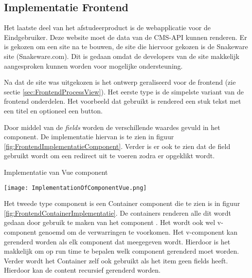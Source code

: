 \subsection{Implementatie Frontend}
Het laatste deel van het afstudeerproduct is de webapplicatie voor de \gls{Eindgebruiker}.
Deze website moet de data van de CMS-API kunnen renderen.
Er is gekozen om een site na te bouwen, de site die hiervoor gekozen is de Snakeware site (Snakeware.com).
Dit is gedaan omdat de developers van de site makkelijk aangesproken kunnen worden voor mogelijke ondersteuning.

\whitespace
Na dat de site was uitgekozen is het ontwerp geraliseerd voor de frontend (zie sectie \ref{sec:FrontendProcessView}).
Het eerste type is de simpelste variant van de frontend onderdelen. 
Het voorbeeld dat gebruikt is rendered een stuk tekst met een titel en optioneel een button.

\whitespace
Door middel van de \textit{fields} worden de verschillende waardes gevuld in het component.
%
De implementatie hiervan is te zien in figuur \ref{fig:FrontendImplementatieComponent}.
Verder is er ook te zien dat de  field gebruikt wordt om  een redirect uit te voeren zodra er opgeklikt wordt.

\whitespace
\begin{graphic}
    \captionsetup{type=figure}
    \caption{Implementatie van Vue component}
    \texttt{[image: ImplementationOfComponentVue.png]}
    \label{fig:FrontendImplementatieComponent}
\end{graphic}

\whitespace
Het tweede type component is een Container component die te zien is in figuur \ref{fig:FrontendContainerImplementatie}.
De containers renderen alle  dit wordt gedaan door gebruik te maken van het component .
Het  wordt ook wel v-component genoemd om de verwarringen te voorkomen.
Het v-component kan gerenderd worden als elk component dat meegegeven wordt.
Hierdoor is het makkelijk om op run time te bepalen welk component gerenderd moet worden.
Verder wordt het Container zelf ook gebruikt als het item geen fields heeft.
Hierdoor kan de content recursief gerenderd worden.

